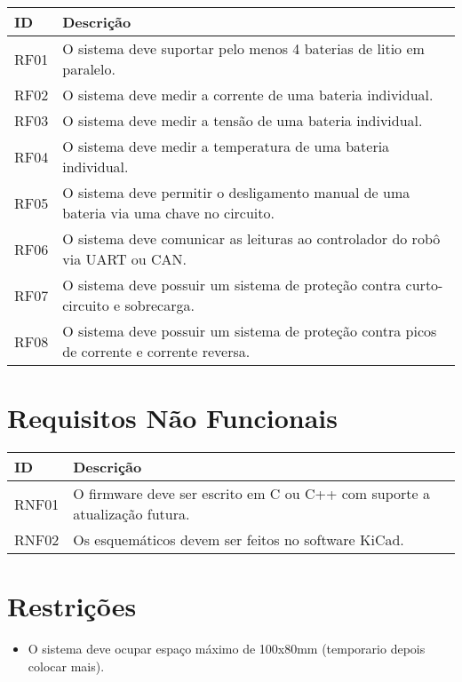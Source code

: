 \documentclass[12pt]{article}
\begin{document}
\begin{longtable}{|p{}|p{}|}
\hline
\textbf{ID} & \textbf{Descrição} \\
\hline
RF01 & O sistema deve suportar pelo menos 4 baterias de litio em paralelo. \\
\hline
RF02 & O sistema deve medir a corrente de uma bateria individual. \\
\hline
RF03 & O sistema deve medir a tensão de uma bateria individual. \\
\hline
RF04 & O sistema deve medir a temperatura de uma bateria individual. \\
\hline
RF05 & O sistema deve permitir o desligamento manual de uma bateria via uma chave no circuito. \\
\hline
RF06 & O sistema deve comunicar as leituras ao controlador do robô via UART ou CAN. \\
\hline
RF07 & O sistema deve possuir um sistema de proteção contra curto-circuito e sobrecarga. \\
\hline
RF08 & O sistema deve possuir um sistema de proteção contra picos de corrente e corrente reversa. \\
\hline
\end{longtable}

\section{Requisitos Não Funcionais}

\begin{longtable}{|p{}|p{}|}
\hline
\textbf{ID} & \textbf{Descrição} \\
\hline
RNF01 & O firmware deve ser escrito em C ou C++ com suporte a atualização futura. \\
\hline
RNF02 & Os esquemáticos devem ser feitos no software KiCad. \\
\hline

\end{longtable}

\section{Restrições}

\begin{itemize}
    \item O sistema deve ocupar espaço máximo de 100x80mm (temporario depois colocar mais).

\end{itemize}
\end{document}
